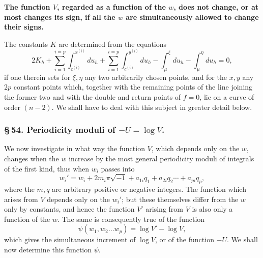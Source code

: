 \documentclass[10pt]{article}
\begin{document}
\textbf{The function \(V\), regarded as a function of the \(w\), does not change, or at most changes its sign, if all the \(w\) are simultaneously allowed to change their signs.}

The constants \(K\) are determined from the equations
\[
2K_h+\sum_{i=1}^{i=p}\int_{c^{(i)}}^{x^{(i)}}du_h+\sum_{i=1}^{i=p}\int_{c^{(i)}}^{y^{(i)}}du_h-\int_{\mu}^{\xi}du_h-\int_{\mu}^{\eta}du_h=0,
\]
if one therein sets for \(\xi,\eta\) any two arbitrarily chosen points, and for the \(x,y\) any \(2p\) constant points which, together with the remaining points of the line joining the former two and with the double and return points of \(f=0\), lie on a curve of order \((n-2)\). We shall have to deal with this subject in greater detail below.

\subsubsection*{\S\,54. Periodicity moduli of \(-U=\log V\).}

We now investigate in what way the function \(V\), which depends only on the \(w\), changes when the \(w\) increase by the most general periodicity moduli of integrals of the first kind, thus when \(w_i\) passes into
\[
w_i'=w_i+2m_i\pi\sqrt{-1}+a_{1i}q_1+a_{2i}q_2\cdots+a_{pi}q_p,
\]
where the \(m,q\) are arbitrary positive or negative integers. The function which arises from \(V\) depends only on the \(w_i'\); but these themselves differ from the \(w\) only by constants, and hence the function \(V'\) arising from \(V\) is also only a function of the \(w\). The same is consequently true of the function
\[
\psi(w_1,w_2\ldots w_p)=\log V'-\log V,
\]
which gives the simultaneous increment of \(\log V\), or of the function \(-U\). We shall now determine this function \(\psi\).
\end{document}

